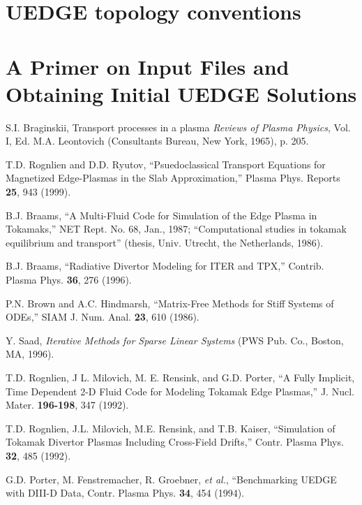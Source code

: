 \documentclass [12pt]{article}
\begin{document}
\section{{\sf UEDGE} topology conventions} 



\section{A Primer on Input Files and Obtaining Initial UEDGE Solutions} 




\begin{thebibliography}{99}
  
 S.I. Braginskii, Transport processes in a plasma {\it Reviews
    of Plasma Physics}, Vol. I, Ed. M.A. Leontovich (Consultants Bureau, New
  York, 1965), p. 205.
  
 T.D. Rognlien and D.D. Ryutov, ``Psuedoclassical Transport
Equations for Magnetized Edge-Plasmas in the Slab Approximation,'' Plasma
Phys. Reports {\bf 25}, 943 (1999).

 B.J. Braams, ``A Multi-Fluid Code for Simulation of the
  Edge Plasma in Tokamaks,'' NET Rept. No. 68, Jan., 1987; ``Computational
  studies in tokamak equilibrium and transport'' (thesis, Univ. Utrecht, the
  Netherlands, 1986).
 
 B.J. Braams, ``Radiative Divertor Modeling for ITER and
  TPX,'' Contrib. Plasma Phys. {\bf 36}, 276 (1996).
  
 P.N. Brown and A.C. Hindmarsh, ``Matrix-Free Methods for
Stiff Systems of ODEs,'' SIAM J. Num. Anal. {\bf 23}, 610 (1986).

 Y. Saad, {\it Iterative Methods for Sparse Linear Systems}
  (PWS Pub. Co., Boston, MA, 1996).

 T.D. Rognlien, J L. Milovich, M. E. Rensink, and G.D. Porter,
  ``A Fully Implicit, Time Dependent 2-D Fluid Code for Modeling Tokamak Edge
  Plasmas,'' J. Nucl. Mater. {\bf 196-198}, 347 (1992).
  
 T.D. Rognlien, J.L. Milovich, M.E. Rensink, and T.B.  Kaiser,
  ``Simulation of Tokamak Divertor Plasmas Including Cross-Field Drifts,''
  Contr. Plasma Phys. {\bf 32}, 485 (1992).

 G.D. Porter, M. Fenstremacher, R. Groebner, {\it et al.},
  ``Benchmarking UEDGE with DIII-D Data, Contr. Plasma Phys. {\bf 34}, 454
  (1994).
  

\end{thebibliography}
\end{document}
